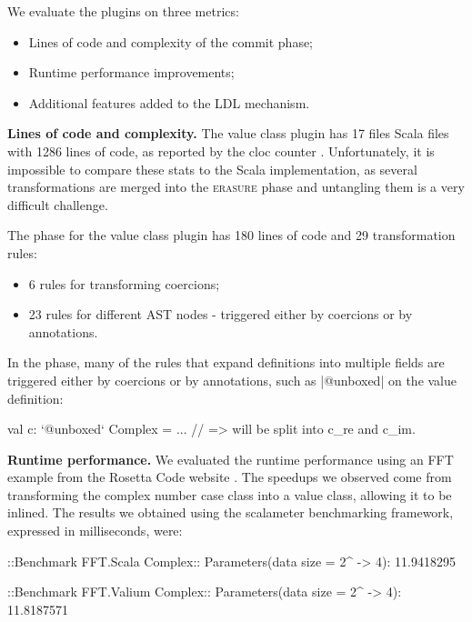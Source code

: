 We evaluate the plugins on three metrics:
\begin{itemize}
\item Lines of code and complexity of the commit phase;
\item Runtime performance improvements;
\item Additional features added to the LDL mechanism.
\end{itemize}

\textbf{Lines of code and complexity.} The value class plugin has 17 files Scala files with 1286 lines of code, as reported by the cloc counter \cite{cloc-util}. Unfortunately, it is impossible to compare these stats to the Scala implementation, as several transformations are merged into the \textsc{erasure} phase and untangling them is a very difficult challenge.

The \commit{} phase for the value class plugin has 180 lines of code and 29 transformation rules:
\begin{itemize}
\item  6 rules for transforming coercions;
\item 23 rules for different AST nodes - triggered either by coercions or by annotations.
\end{itemize}

In the \commit{} phase, many of the rules that expand definitions into multiple fields are triggered either by coercions or by annotations, such as |@unboxed| on the value definition:

\begin{lstlisting-nobreak}
 val c: `@unboxed` Complex = ...
 //        => will be split into c_re and c_im.
\end{lstlisting-nobreak}

\textbf{Runtime performance.} We evaluated the runtime performance using an FFT example from the Rosetta Code website \cite{rosetta-code}. The speedups we observed come from transforming the complex number case class into a value class, allowing it to be inlined. The results we obtained using the scalameter \cite{scalameter} benchmarking framework, expressed in milliseconds, were:

\begin{lstlisting-nobreak}
 ::Benchmark FFT.Scala Complex::
 Parameters(data size = 2^ -> 4): 11.9418295

 ::Benchmark FFT.Valium Complex::
 Parameters(data size = 2^ -> 4): 11.8187571
\end{lstlisting-nobreak}

